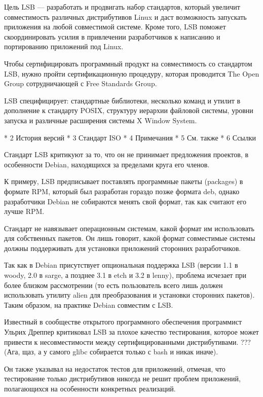     Цель LSB — разработать и продвигать набор стандартов, который увеличит совместимость различных дистрибутивов Linux и даст возможность запускать приложения на любой совместимой системе. Кроме того, LSB поможет скоординировать усилия в привлечении разработчиков к написанию и портированию приложений под Linux.

Чтобы сертифицировать программный продукт на совместимость со стандартом LSB, нужно пройти сертификационную процедуру, которая проводится The Open Group сотрудничающей с Free Standards Group.

LSB специфицирует: стандартные библиотеки, несколько команд и утилит в дополнение к стандарту POSIX, структуру иерархии файловой системы, уровни запуска и различные расширения системы X Window System.

    * 2 История версий
    * 3 Стандарт ISO
    * 4 Примечания
    * 5 См. также
    * 6 Ссылки

Стандарт LSB критикуют за то, что он не принимает предложения проектов, в особенности Debian, находящихся за пределами круга его членов.

К примеру, LSB предписывает поставлять программные пакеты (packages) в формате RPM, который был разработан гораздо позже формата deb, однако разработчики Debian не собираются менять свой формат, так как считают его лучше RPM.

Стандарт не навязывает операционным системам, какой формат им использовать для собственных пакетов. Он лишь говорит, какой формат совместимые системы должны поддерживать для установки приложений сторонних разработчиков.

Так как в Debian присутствует опциональная поддержка LSB (версии 1.1 в woody, 2.0 в sarge, а позднее 3.1 в etch и 3.2 в lenny), проблема исчезает при более близком рассмотрении (то есть пользователь всего лишь должен использовать утилиту alien для преобразования и установки сторонних пакетов). Таким образом, на практике Debian совместим с LSB.

Известный в сообществе открытого программного обеспечения программист Ульрих Дреппер критиковал LSB за плохое качество тестирования, которое может привести к несовместимости между сертифицированными дистрибутивами. ??? (Ага, щаз, а у самого glibc собирается только с bash и никак иначе).

Он также указывал на недостаток тестов для приложений, отмечая, что тестирование только дистрибутивов никогда не решит проблем приложений, полагающихся на особенности конкретных реализаций.

